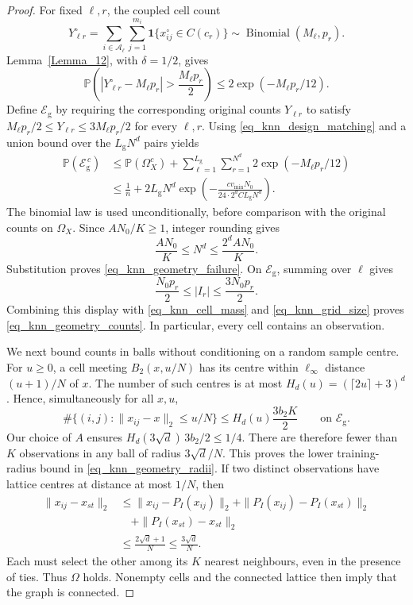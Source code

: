 \documentclass[twoside,11pt]{article}
\newenvironment{revision}{\color{revisionred}}{}
\begin{document}
\begin{revision}
\begin{proof}
For fixed $\ell,r$, the coupled cell count
\[
Y_{\ell r}^\circ
=\sum_{i\in\mathcal A_\ell}\sum_{j=1}^{m_i}
  \mathbf1\{x_{ij}^\circ\in C(c_r)\}
\sim\operatorname{Binomial}(M_\ell,p_r).
\]
Lemma~\ref{Lemma_12}, with $\delta=1/2$, gives
\[
\mathbb P\left(
 |Y_{\ell r}^\circ-M_\ell p_r|>\frac{M_\ell p_r}{2}\right)
\leq2\exp(-M_\ell p_r/12).
\]
Define $\mathcal E_{\mathrm g}$ by requiring the corresponding
original counts $Y_{\ell r}$ to satisfy
$M_\ell p_r/2\leq Y_{\ell r}\leq3M_\ell p_r/2$ for every $\ell,r$.
Using \eqref{eq_knn_design_matching} and a union bound over the
$L_{\mathrm g}N^d$ pairs yields
\begin{align}
\label{eq_knn_geometry_union}
\mathbb P(\mathcal E_{\mathrm g}^{\,c})
&\leq\mathbb P(\Omega_X^c)
 +\sum_{\ell=1}^{L_{\mathrm g}}\sum_{r=1}^{N^d}
       2\exp(-M_\ell p_r/12)\\
&\leq\frac1n+2L_{\mathrm g}N^d
 \exp\left(-\frac{c v_{\min}N_0}
                 {24\cdot2^d C L_{\mathrm g}N^d}\right).
\nonumber
\end{align}
The binomial law is used unconditionally, before comparison with
the original counts on $\Omega_X$.
Since $A N_0/K\geq1$, integer rounding gives
\begin{equation}
\label{eq_knn_grid_size}
\frac{A N_0}{K}\leq N^d\leq\frac{2^d A N_0}{K}.
\end{equation}
Substitution proves \eqref{eq_knn_geometry_failure}.
On $\mathcal E_{\mathrm g}$, summing over $\ell$ gives
\[
\frac{N_0p_r}{2}\leq|I_r|\leq\frac{3N_0p_r}{2}.
\]
Combining this display with \eqref{eq_knn_cell_mass} and
\eqref{eq_knn_grid_size} proves \eqref{eq_knn_geometry_counts}.
In particular, every cell contains an observation.

We next bound counts in balls without conditioning on a random
sample centre. For $u\geq0$, a cell meeting $B_2(x,u/N)$ has its
centre within $\ell_\infty$ distance $(u+1)/N$ of $x$.
The number of such centres is at most
$H_d(u)=(\lceil2u\rceil+3)^d$. Hence, simultaneously for all $x,u$,
\begin{equation}
\label{eq_knn_ball_counts}
\#\{(i,j):\|x_{ij}-x\|_2\leq u/N\}
\leq H_d(u)\frac{3b_2K}{2}
\qquad\text{on }\mathcal E_{\mathrm g}.
\end{equation}
Our choice of $A$ ensures
$H_d(3\sqrt d)\,3b_2/2\leq1/4$.
There are therefore fewer than $K$ observations in any ball of
radius $3\sqrt d/N$. This proves the lower training-radius bound
in \eqref{eq_knn_geometry_radii}. If two distinct observations
have lattice centres at distance at most $1/N$, then
\[
\begin{aligned}
\|x_{ij}-x_{st}\|_2
&\leq\|x_{ij}-P_I(x_{ij})\|_2
 +\|P_I(x_{ij})-P_I(x_{st})\|_2\\
&\quad+\|P_I(x_{st})-x_{st}\|_2\\
&\leq\frac{2\sqrt d+1}{N}\leq\frac{3\sqrt d}{N}.
\end{aligned}
\]
Each must select the other among its $K$ nearest neighbours, even
in the presence of ties. Thus $\Omega$ holds. Nonempty cells and
the connected lattice then imply that the graph is connected.


\end{proof}
\end{revision}
\end{document}
